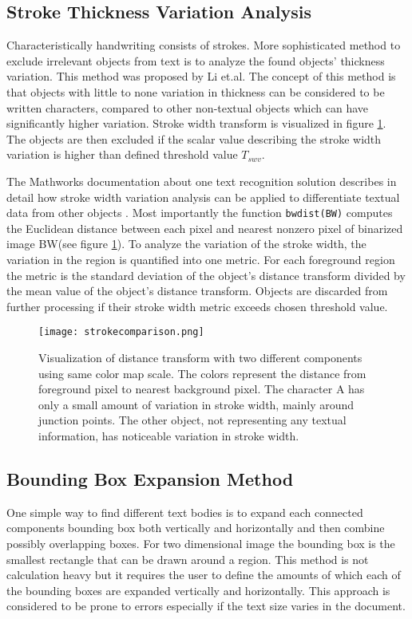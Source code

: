 \documentclass{article}
\def\code#1{\texttt{#1}}
\begin{document}
        \subsection{Stroke Thickness Variation Analysis}
          Characteristically handwriting consists of strokes. More sophisticated method to exclude irrelevant objects from text is to analyze the found objects' thickness variation. This method was proposed by Li et.al. \cite{Li} The concept of this method is that objects with little to none variation in thickness can be considered to be written characters, compared to other non-textual objects which can have significantly higher variation. Stroke width transform is visualized in figure \ref{fig:strokewidth}. The objects are then excluded if the scalar value describing the stroke width variation is higher than defined threshold value $T_{swv}$.

          The Mathworks documentation about one text recognition solution describes in detail how stroke width variation analysis can be applied to differentiate textual data from other objects \cite{MathworksTextRecognition}. Most importantly the function \code{bwdist(BW)} computes the Euclidean distance between each pixel and nearest nonzero pixel of binarized image BW(see figure \ref{fig:strokewidth}). To analyze the variation of the stroke width, the variation in the region is quantified into one metric. For each foreground region the metric is the standard deviation of the object's distance transform divided by the mean value of the object's distance transform. Objects are discarded from further processing if their stroke width metric exceeds chosen threshold value.

          \begin{figure}[!ht]
            \centering
            \texttt{[image: strokecomparison.png]}
            \caption{Visualization of distance transform with two different components using same color map scale. The colors represent the distance from foreground pixel to nearest background pixel. The character A has only a small amount of variation in stroke width, mainly around junction points. The other object, not representing any textual information, has noticeable variation in stroke width. \label{fig:strokewidth} }
          \end{figure}

        \subsection{Bounding Box Expansion Method}
          One simple way to find different text bodies is to expand each connected components bounding box both vertically and horizontally and then combine possibly overlapping boxes. For two dimensional image the bounding box is the smallest rectangle that can be drawn around a region. This method is not calculation heavy but it requires the user to define the amounts of which each of the bounding boxes are expanded vertically and horizontally. This approach is considered to be prone to errors especially if the text size varies in the document.
\end{document}
